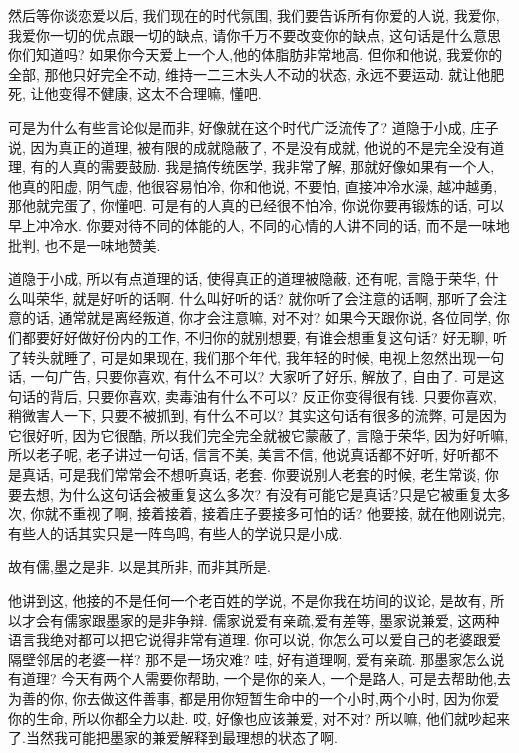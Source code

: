 \documentclass[11pt]{article}
\begin{document}
然后等你谈恋爱以后, 我们现在的时代氛围, 我们要告诉所有你爱的人说, 我爱你, 我爱你一切的优点跟一切的缺点, 请你千万不要改变你的缺点, 这句话是什么意思你们知道吗? 如果你今天爱上一个人,他的体脂肪非常地高. 但你和他说, 我爱你的全部, 那他只好完全不动, 维持一二三木头人不动的状态, 永远不要运动. 就让他肥死, 让他变得不健康, 这太不合理嘛, 懂吧. 

可是为什么有些言论似是而非, 好像就在这个时代广泛流传了? {\color{blue} 道隐于小成}, 庄子说, 因为真正的道理, 被有限的成就隐蔽了, 不是没有成就, 他说的不是完全没有道理, 有的人真的需要鼓励. 我是搞传统医学, 我非常了解, 那就好像如果有一个人, 他真的阳虚, 阴气虚, 他很容易怕冷, 你和他说, 不要怕, 直接冲冷水澡, 越冲越勇, 那他就完蛋了, 你懂吧. 可是有的人真的已经很不怕冷,
你说你要再锻炼的话, 可以早上冲冷水. 你要对待不同的体能的人, 不同的心情的人讲不同的话, 而不是一味地批判, 也不是一味地赞美.

{\color{blue} 道隐于小成}, 所以有点道理的话, 使得真正的道理被隐蔽, 还有呢, {\color{blue} 言隐于荣华}, 什么叫荣华, 就是好听的话啊. 什么叫好听的话? 就你听了会注意的话啊, 那听了会注意的话, 通常就是离经叛道, 你才会注意嘛, 对不对? 如果今天跟你说, 各位同学, 你们都要好好做好份内的工作, 不归你的就别想要, 有谁会想重复这句话? 好无聊, 听了转头就睡了, 可是如果现在, 我们那个年代, 我年轻的时候, 电视上忽然出现一句话, 一句广告, 只要你喜欢, 有什么不可以? 大家听了好乐, 解放了, 自由了. 可是这句话的背后, 只要你喜欢, 卖毒油有什么不可以? 反正你变得很有钱. 只要你喜欢, 稍微害人一下, 只要不被抓到, 有什么不可以? 其实这句话有很多的流弊, 可是因为它很好听, 因为它很酷, 所以我们完全完全就被它蒙蔽了, {\color{blue} 言隐于荣华}, 因为好听嘛, 所以老子呢, 老子讲过一句话, 信言不美, 美言不信, 他说真话都不好听, 好听都不是真话, 可是我们常常会不想听真话, 老套. 你要说别人老套的时候, 老生常谈, 你要去想, 为什么这句话会被重复这么多次? 有没有可能它是真话?只是它被重复太多次, 你就不重视了啊, 接着接着, 接着庄子要接多可怕的话? 他要接, 就在他刚说完, 有些人的话其实只是一阵鸟鸣, 有些人的学说只是小成.

{\begin{center}
		{\color{green} 故有儒,墨之是非. 以是其所非, 而非其所是.}
\end{center}}

\vspace{-0.5cm}

他讲到这, 他接的不是任何一个老百姓的学说, 不是你我在坊间的议论, 是故有, 所以才会有儒家跟墨家的是非争辩. 儒家说爱有亲疏,爱有差等, 墨家说兼爱, 这两种语言我绝对都可以把它说得非常有道理.
你可以说, 你怎么可以爱自己的老婆跟爱隔壁邻居的老婆一样? 那不是一场灾难? 哇, 好有道理啊, 爱有亲疏. 那墨家怎么说有道理? 今天有两个人需要你帮助, 一个是你的亲人, 一个是路人, 可是去帮助他,去为善的你, 你去做这件善事, 都是用你短暂生命中的一个小时,两个小时, 因为你爱你的生命, 所以你都全力以赴. 哎, 好像也应该兼爱, 对不对? 所以嘛, 他们就吵起来了.当然我可能把墨家的兼爱解释到最理想的状态了啊.
\end{document}
